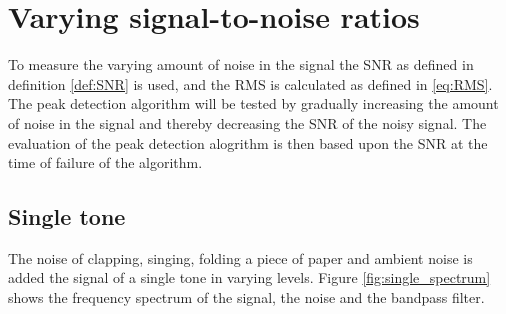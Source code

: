 \section{Varying signal-to-noise ratios}
To measure the varying amount of noise in the signal the SNR as defined in definition \ref{def:SNR} is used, and the RMS is calculated as defined in \eqref{eq:RMS}. The peak detection algorithm will be tested by gradually increasing the amount of noise in the signal and thereby decreasing the SNR of the noisy signal. The evaluation of the peak detection alogrithm is then based upon the SNR at the time of failure of the algorithm.

\subsection{Single tone}
The noise of clapping, singing, folding a piece of paper and ambient noise is added the signal of a single tone in varying levels. Figure \ref{fig:single_spectrum} shows the frequency spectrum of the signal, the noise and the bandpass filter.

